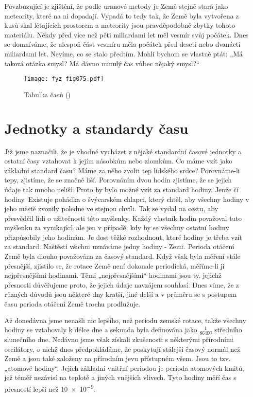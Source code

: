     Povzbuzující je zjištění, že podle uranové metody je Země stejně stará jako meteority, které na 
    ni dopadají. Vypadá to tedy tak, že Země byla vytvořena z kusů skal létajících prostorem a 
    meteority jsou pravděpodobně zbytky tohoto materiálu. Někdy před více než pěti miliardami let 
    měl vesmír svůj počátek. Dnes se domníváme, že alespoň část vesmíru měla počátek před deseti 
    nebo dvanácti miliardami let. Nevíme, co se stalo předtím. Mohli bychom se vlastně ptát: „Má 
    taková otázka smysl? Má dávno minulý čas vůbec nějaký smysl?“
    
    \begin{figure}[ht!]  %
      \centering
      \texttt{[image: fyz\_fig075.pdf]}
      \caption{Tabulka časů (\cite[s.~69]{Feynman01})}
      \label{fyz:fig075}
    \end{figure}

  \section{Jednotky a standardy času}
    Již jsme naznačili, že je vhodné vycházet z nějaké standardní časové jednotky a ostatní časy 
    vztahovat k jejím násobkům nebo zlomkům. Co máme vzít jako základní standard času? Máme za něho 
    zvolit tep lidského srdce? Porovnáme-li tepy, zjistíme, že se značně liší. Porovnáním dvou 
    hodin zjistíme, že se jejich údaje tak mnoho neliší. Proto by bylo možné vzít za standard 
    hodiny. Jenže čí hodiny. Existuje pohádka o švýcarském chlapci, který chtěl, aby všechny hodiny 
    v jeho městě zvonily poledne ve stejnou chvíli. Tak se vydal na cestu, aby přesvědčil lidi o 
    užitečnosti této myšlenky. Každý vlastník hodin považoval tuto myšlenku za vynikající, ale jen 
    v případě, kdy by se všechny ostatní hodiny přizpůsobily jeho hodinám. Je dost těžké 
    rozhodnout, které hodiny je třeba vzít za standard. Naštěstí všichni uznáváme jedny hodiny - 
    Zemi. Perioda otáčení Země byla dlouho považována za časový standard. Když však byla měření 
    stále přesnější, zjistilo se, že rotace Země není dokonale periodická, měříme-li ji 
    nejpřesnějšími hodinami. Těmi „nejpřesnějšími“ hodinami jsou ty, jejichž přesnosti důvěřujeme 
    proto, že jejich údaje navzájem souhlasí. Dnes víme, že z různých důvodů jsou některé dny 
    kratší, jiné delší a v průměru se s postupem času perioda otáčení Země trochu prodlužuje.
    
    Až donedávna jsme nenašli nic lepšího, než periodu zemské rotace, takže všechny hodiny se 
    vztahovaly k délce dne a sekunda byla definována jako \(\frac{1}{\num{86400}}\) středního 
    slunečního dne. Nedávno jsme však získali zkušenosti s některými přírodními oscilátory, o nichž 
    dnes předpokládáme, že poskytují stálejší časový normál než Země a jsou také založeny na 
    přírodním jevu přístupném všem. Jsou to tzv. „atomové hodiny“. Jejich základní vnitřní periodou 
    je perioda atomových kmitů, jež téměř nezávisí na teplotě a jiných vnějších vlivech. Tyto 
    hodiny měří čas s přesností lepší než \num{10e-9}.
    
